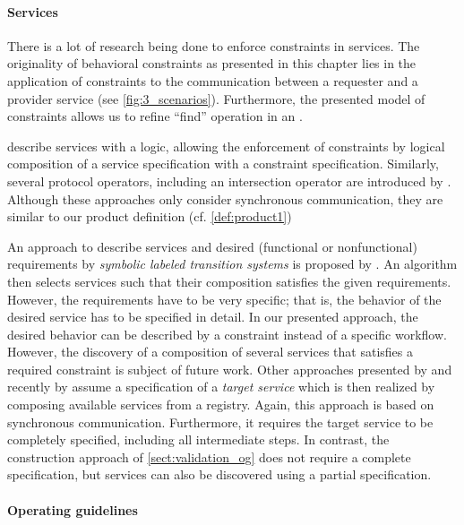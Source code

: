 \paragraph{Services}

There is a lot of research being done to enforce constraints in services. The originality of behavioral constraints as presented in this chapter lies in the application of constraints to the communication between a requester and a provider service (see \autoref{fig:3_scenarios}). Furthermore, the presented model of constraints allows us to refine ``find'' operation in an .

\citet{DavulcuKR04_WWW} describe services with a logic, allowing the enforcement of constraints by logical composition of a service specification with a constraint specification. Similarly, several protocol operators, including an intersection operator are introduced by \citet{BenatallahCT06_DKE}. Although these approaches only consider synchronous communication, they are similar to our product definition (cf. \autoref{def:product1})

An approach to describe services and desired (functional or nonfunctional) requirements by \emph{symbolic labeled transition systems} is proposed by \citet{PathakBH06_ICSOC}. An algorithm then selects services such that their composition satisfies the given requirements. However, the requirements have to be very specific; that is, the behavior of the desired service has to be specified in detail. In our presented approach, the desired behavior can be described by a constraint instead of a specific workflow. However, the discovery of a composition of several services that satisfies a required constraint is subject of future work. Other approaches presented by \citet{BerardiCGM05} and recently by \citet{GiacomoP_2009_wsfm} assume a specification of a \emph{target service} which is then realized by composing available services from a registry. Again, this approach is based on synchronous communication. Furthermore, it requires the target service to be completely specified, including all intermediate steps. In contrast, the construction approach of \autoref{sect:validation_og} does not require a complete specification, but services can also be discovered using a partial specification.


\paragraph{Operating guidelines}

